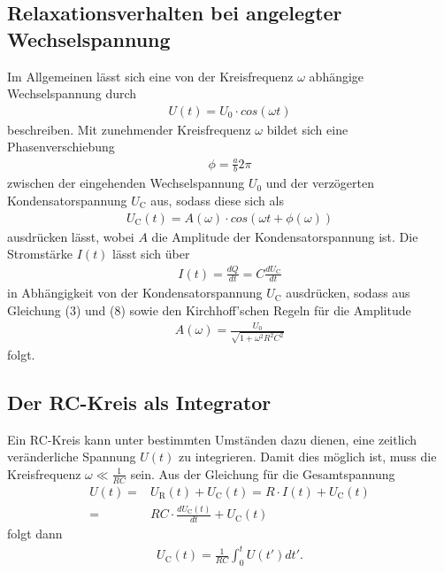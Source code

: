 \subsection{Relaxationsverhalten bei angelegter Wechselspannung}
Im Allgemeinen lässt sich eine von der Kreisfrequenz $\omega$ abhängige Wechselspannung durch
\begin{align}
U(t) = U_\text{0} \cdot cos(\omega t)
\end{align}
beschreiben.
Mit zunehmender Kreisfrequenz $\omega$ bildet sich eine Phasenverschiebung 
\begin{align}
\phi = \frac{a}{b} 2 \pi
\end{align} zwischen der 
eingehenden Wechselspannung $U_\text{0}$ und der verzögerten Kondensatorspannung $U_\text{C}$
aus, sodass diese sich als
\begin{align}
U_\text{C}(t) = A(\omega) \cdot cos(\omega t + \phi(\omega))
\end{align}
ausdrücken lässt, wobei $A$ die Amplitude der Kondensatorspannung ist.
Die Stromstärke $I(t)$ lässt sich über
\begin{align}
I(t) = \frac{dQ}{dt} = C \frac{dU_\text{C}}{dt}
\end{align}
in Abhängigkeit von der Kondensatorspannung $U_\text{C}$ ausdrücken, sodass aus 
Gleichung (3) und (8) sowie den Kirchhoff'schen Regeln für die Amplitude
\begin{align}
A(\omega) = \frac{U_\text{0}}{\sqrt{1+\omega^2R^2C^2}}
\end{align}
folgt.

\subsection{Der RC-Kreis als Integrator}
Ein RC-Kreis kann unter bestimmten Umständen dazu dienen, eine zeitlich veränderliche Spannung 
$U(t)$ zu integrieren. Damit dies möglich ist, muss die Kreisfrequenz $\omega \ll \frac{1}{RC}$ sein.
Aus der Gleichung für die Gesamtspannung
\begin{align*}
U(t) = {} & U_\text{R}(t) + U_\text{C}(t) = R \cdot I(t) + U_\text{C}(t) \\
     = {} & RC \cdot \frac{dU_\text{C}(t)}{dt} + U_\text{C}(t)
\end{align*}
folgt dann
\begin{align}
U_\text{C}(t) = \frac{1}{RC} \int_0^t U(t')dt'.
\end{align}
